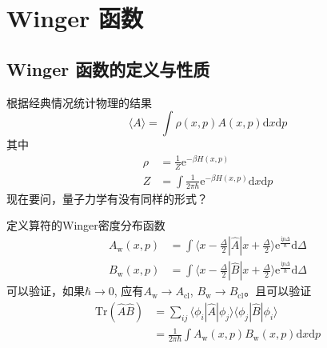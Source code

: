\chapter{Winger 函数}
    \section{Winger 函数的定义与性质}

        根据经典情况统计物理的结果
        \begin{equation*}
            \langle A \rangle = \int \rho(x,p) A(x,p) \mathrm{d}x\mathrm{d}p
        \end{equation*}
        其中 
        \begin{align*}
            \rho &= \frac 1Z \mathrm{e}^{-\beta H(x,p)}\\
            Z &= \int \frac 1{2\pi \hbar} \mathrm{e}^{-\beta H(x,p)} \mathrm{d}x \mathrm{d}p
        \end{align*}
        现在要问，量子力学有没有同样的形式？

        定义算符的Winger密度分布函数
        \begin{align*}
            A_\mathrm{w}(x,p) &= \int \langle x - \frac {\Delta}2 | \hat{A} | x + \frac {\Delta}2 \rangle \mathrm{e}^{\frac {\mathrm{i} p \Delta}{\hbar}} \mathrm{d} \Delta \\
            B_\mathrm{w}(x,p) &= \int \langle x - \frac {\Delta}2 | \hat{B} | x + \frac {\Delta}2 \rangle \mathrm{e}^{\frac {\mathrm{i} p \Delta}{\hbar}} \mathrm{d} \Delta 
        \end{align*}
        可以验证，如果$\hbar \to 0$, 应有$A_\mathrm{w} \to A_\mathrm{cl}$, $B_\mathrm{w} \to B_\mathrm{cl}$。且可以验证
        \begin{align*}
            \mathrm{Tr} (\hat{A}\hat{B}) &= \sum_{ij} \langle \phi_{i} | \hat{A} | \phi_{j} \rangle \langle \phi_{j} | \hat{B} | \phi_{i} \rangle \\
            &= \frac 1{2\pi\hbar} \int A_\mathrm{w}(x,p) B_\mathrm{w}(x,p) \mathrm{d}x \mathrm{d}p
        \end{align*}

